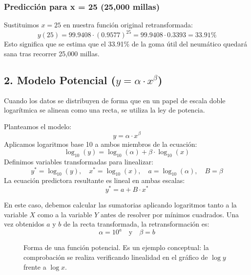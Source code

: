 \documentclass[11pt,a4paper]{article}
\begin{document}
    \subsubsection*{Predicción para x = 25 (25,000 millas)}
    Sustituimos $x = 25$ en nuestra función original retransformada:
    \[ y(25) = 99.9408 \cdot (0.9577)^{25} = 99.9408 \cdot 0.3393 = \mathbf{33.91\%} \]
    Esto significa que se estima que el 33.91\% de la goma útil del neumático quedará sana tras recorrer 25,000 millas.
 

\newpage
\subsection{2. Modelo Potencial ($y = \alpha \cdot x^\beta$)}
    Cuando los datos se distribuyen de forma que en un papel de escala doble logarítmica se alinean como una recta, se utiliza la ley de potencia.
    
    Planteamos el modelo:
    \[ y = \alpha \cdot x^\beta \]
    Aplicamos logaritmos base 10 a ambos miembros de la ecuación:
    \begin{equation}
        \log_{10}(y) = \log_{10}(\alpha) + \beta \cdot \log_{10}(x)
    \end{equation}
    Definimos variables transformadas para linealizar:
    \[ y^* = \log_{10}(y), \quad x^* = \log_{10}(x), \quad a = \log_{10}(\alpha), \quad B = \beta \]
    La ecuación predictora resultante es lineal en ambas escalas:
    \[ y^* = a + B \cdot x^* \]
    
    En este caso, debemos calcular las sumatorias aplicando logaritmos tanto a la variable $X$ como a la variable $Y$ antes de resolver por mínimos cuadrados. Una vez obtenidos $a$ y $b$ de la recta transformada, la retransformación es:
    \[ \alpha = 10^a \quad \text{y} \quad \beta = b \]

    \begin{figure}[htbp]
        \centering
        \caption{Forma de una función potencial. Es un ejemplo conceptual: la comprobación se realiza verificando linealidad en el gráfico de $\log y$ frente a $\log x$.}
        \label{fig:potencial}
    \end{figure}
 
\end{document}
